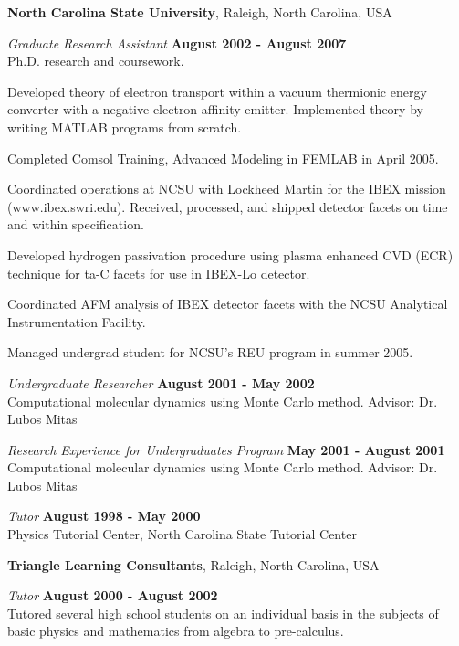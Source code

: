 \documentclass[letterpaper,margin,line]{res}
\newenvironment{list1}{
  \begin{list}{\ding{113}}{%
      \setlength{\itemsep}{0in}
      \setlength{\parsep}{0in} \setlength{\parskip}{0in}
      \setlength{\topsep}{0in} \setlength{\partopsep}{0in} 
      \setlength{\leftmargin}{0.17in}}}{\end{list}}
\begin{document}
\begin{resume}
{\bf North Carolina State University}, Raleigh, North Carolina, USA

\vspace{-.3cm}
{\em Graduate Research Assistant} \hfill {\bf August 2002 - August 2007}\\
Ph.D. research and coursework.
\begin{list1}
\item[] Developed theory of electron transport within a vacuum thermionic energy converter with a negative electron affinity emitter. Implemented theory by writing MATLAB programs from scratch.
\item[] Completed Comsol Training, Advanced Modeling in FEMLAB in April 2005.
\item[] Coordinated operations at NCSU with Lockheed Martin for the IBEX mission (www.ibex.swri.edu). Received, processed, and shipped detector facets on time and within specification.
\item[] Developed hydrogen passivation procedure using plasma enhanced CVD (ECR) technique for ta-C facets for use in IBEX-Lo detector.
\item[] Coordinated AFM analysis of IBEX detector facets with the NCSU Analytical Instrumentation Facility.
\item[] Managed undergrad student for NCSU's REU program in summer 2005.
\end{list1}

{\em Undergraduate Researcher} \hfill {\bf August 2001 - May 2002}\\
Computational molecular dynamics using Monte Carlo method. Advisor: Dr. Lubos Mitas

{\em Research Experience for Undergraduates Program} \hfill {\bf May 2001 - August 2001}\\
Computational molecular dynamics using Monte Carlo method. Advisor: Dr. Lubos Mitas

{\em Tutor} \hfill {\bf August 1998 - May 2000}\\
Physics Tutorial Center, North Carolina State Tutorial Center

{\bf Triangle Learning Consultants}, Raleigh, North Carolina, USA

\vspace{-.3cm}
{\em Tutor} \hfill {\bf August 2000 - August 2002}\\
Tutored several high school students on an individual basis in the subjects of basic physics and mathematics from algebra to pre-calculus.



\end{resume}
\end{document}
